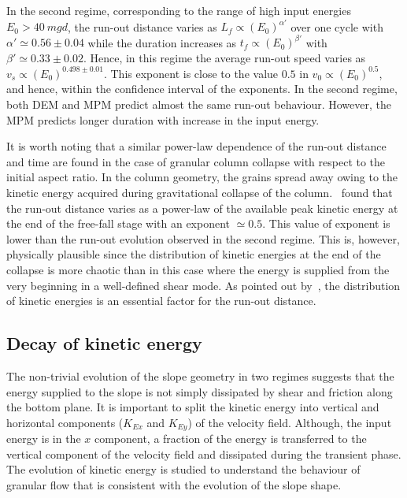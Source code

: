 \documentclass[3p,times,procedia,number]{elsarticle}
\begin{document}
In the second regime, corresponding to the range of high input energies  $E_0 > 
40 \ mgd$, the run-out distance varies as $L_f \propto (E_0)^{\alpha'}$ over 
one cycle with $\alpha' \simeq 0.56\pm 0.04$ while the duration increases as 
$t_f \propto (E_0)^{\beta'}$ with $\beta' \simeq 0.33 \pm 0.02$. Hence, in this 
regime the average run-out speed varies as $v_s \propto (E_0)^{0.498 \pm 
0.01}$. This exponent is close to the value $0.5$ in $v_0 \propto (E_0)^{0.5}$, 
and hence, within the confidence interval of the exponents.
In the second regime, both DEM and MPM predict almost the same run-out 
behaviour. However, the MPM predicts longer duration with increase in the input 
energy.

It is worth noting that a similar power-law dependence of the run-out distance 
and time are found in the case of granular column collapse with respect to 
the initial aspect ratio. In the column geometry, the grains spread away 
owing to the kinetic energy acquired during gravitational collapse of the 
column.~\citet{Topin2012} found that the run-out distance varies as a power-law 
of the available peak kinetic energy at the end of the free-fall stage with an 
exponent $\simeq 0.5$. This value of exponent is lower than the run-out 
evolution observed in the second regime. This is, however, physically plausible 
since the distribution of kinetic energies at the end of the collapse 
is more chaotic than in this case where the energy is supplied from the very 
beginning in a well-defined shear mode. As pointed out by~\citet{Staron2005}, 
the distribution of kinetic energies is an essential factor for the run-out 
distance.

\subsection{Decay of kinetic energy}
\label{sec:decay}

The non-trivial evolution of the slope geometry in two regimes suggests that 
the energy supplied to the slope is not simply dissipated by shear and friction 
along the bottom plane. It is important to split the kinetic energy into 
vertical and horizontal components ($K_{Ex}$ and $K_{Ey}$) of the velocity 
field. Although, the input energy is in the $x$ component, a fraction of 
the energy is transferred to the vertical component of the velocity field and 
dissipated during the transient phase. The evolution of kinetic energy is 
studied to understand the behaviour of granular flow that is consistent with 
the evolution of the slope shape.
\end{document}
